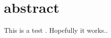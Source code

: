 \documentclass[../main.tex]{subfiles}
\begin{document}
                                                
\chapter*{abstract}                                
This is a test \cite{shaw97}. Hopefully it works..              
\biblio                                                         
\end{document}
